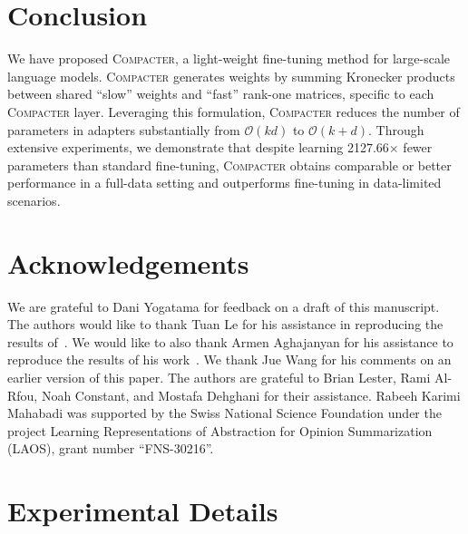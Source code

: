 \documentclass{article}
\newcommand{\compacter}{\textsc{Compacter}\xspace}
\begin{document}
\vspace{-0.5em}
\section{Conclusion}
We have proposed \compacter, a light-weight fine-tuning method for large-scale language models. \compacter generates weights by summing Kronecker products between shared ``slow'' weights and ``fast'' rank-one matrices, specific to each \compacter layer. Leveraging this formulation, \compacter reduces the number of parameters in adapters substantially from $\mathcal{O}(kd)$ to $\mathcal{O}(k+d)$. Through extensive experiments, we demonstrate that despite learning 2127.66$\times$ fewer parameters than standard fine-tuning, \compacter obtains comparable or better performance in a full-data setting and outperforms fine-tuning in data-limited scenarios. 

\section*{Acknowledgements}
We are grateful to Dani Yogatama for feedback on a draft of this manuscript. The authors would like to thank Tuan Le for his assistance in reproducing the results of~\citet{zhang2021beyond}. We would like to also thank Armen Aghajanyan for his assistance to reproduce the results of his work~\citep{aghajanyan2020intrinsic}. We thank Jue Wang for his comments on an earlier version of this paper. The authors are grateful to Brian Lester, Rami Al-Rfou, Noah Constant, and Mostafa Dehghani for their assistance. Rabeeh Karimi Mahabadi was supported by the Swiss National Science Foundation under the project Learning Representations of Abstraction for Opinion Summarization (LAOS), grant number “FNS-30216”. 



{%

} 



\clearpage
\appendix
\section{Experimental Details} \label{app:experimental_detials}
\end{document}
